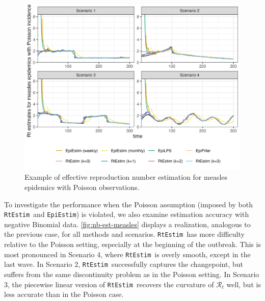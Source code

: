 \documentclass[10pt,letterpaper]{article}
\def\RtEstim{\texttt{RtEstim}}
\def\EpiEstim{\texttt{EpiEstim}}
\def\calR{\mathcal{R}}
\begin{document}
\begin{figure}[!ht]
  \centering
  \includegraphics[width=.99\textwidth]{fig/fig_res_pois_measles.png}
  \caption{Example of effective reproduction number estimation for measles epidemics with Poisson observations.}
  \label{fig:pois-est-measles}
\end{figure}

To investigate the performance when the Poisson assumption (imposed by both
\RtEstim\ and \EpiEstim) is violated, we also examine estimation accuracy with
negative Binomial data. \autoref{fig:nb-est-measles} displays a realization, analogous
to the previous case, for all methods and scenarios. \RtEstim\ has more
difficulty relative to the Poisson setting, especially at the beginning of the
outbreak. This is most pronounced in Scenario 4, where \RtEstim\ is overly
smooth, except in the last wave. In Scenario 2, \RtEstim\ successfully captures
the changepoint, but suffers from the same discontinuity problem as in the
Poisson setting. In Scenario 3, the piecewise linear version of \RtEstim\
recovers the curvature of $\calR_t$ well, but is less accurate than in the
Poisson case.
\end{document}
